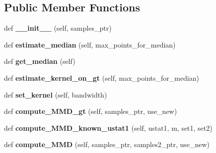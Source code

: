 \subsection*{Public Member Functions}
\begin{DoxyCompactItemize}
\item 
def {\bfseries \+\_\+\+\_\+init\+\_\+\+\_\+} (self, samples\+\_\+ptr)\hypertarget{classMMD_1_1MMD_aee6c212b82cacdcd4bceada64dd3ad97}{}\label{classMMD_1_1MMD_aee6c212b82cacdcd4bceada64dd3ad97}

\item 
def {\bfseries estimate\+\_\+median} (self, max\+\_\+points\+\_\+for\+\_\+median)\hypertarget{classMMD_1_1MMD_af224846bbc6951fd2c6621d98601299e}{}\label{classMMD_1_1MMD_af224846bbc6951fd2c6621d98601299e}

\item 
def {\bfseries get\+\_\+median} (self)\hypertarget{classMMD_1_1MMD_a013aa9cb2ebfadcdaf8d4661e9a451e8}{}\label{classMMD_1_1MMD_a013aa9cb2ebfadcdaf8d4661e9a451e8}

\item 
def {\bfseries estimate\+\_\+kernel\+\_\+on\+\_\+gt} (self, max\+\_\+points\+\_\+for\+\_\+median)\hypertarget{classMMD_1_1MMD_a6a584cc6723100eea920019b0d5f1902}{}\label{classMMD_1_1MMD_a6a584cc6723100eea920019b0d5f1902}

\item 
def {\bfseries set\+\_\+kernel} (self, bandwidth)\hypertarget{classMMD_1_1MMD_ad0f36278070313883a42b5cb7327fcd3}{}\label{classMMD_1_1MMD_ad0f36278070313883a42b5cb7327fcd3}

\item 
def {\bfseries compute\+\_\+\+M\+M\+D\+\_\+gt} (self, samples\+\_\+ptr, use\+\_\+new)\hypertarget{classMMD_1_1MMD_a7626a491ad1fd8dbec69e94c78759839}{}\label{classMMD_1_1MMD_a7626a491ad1fd8dbec69e94c78759839}

\item 
def {\bfseries compute\+\_\+\+M\+M\+D\+\_\+known\+\_\+ustat1} (self, ustat1, m, set1, set2)\hypertarget{classMMD_1_1MMD_acac49d722b26de3659f0a089fe448b0f}{}\label{classMMD_1_1MMD_acac49d722b26de3659f0a089fe448b0f}

\item 
def {\bfseries compute\+\_\+\+M\+MD} (self, samples\+\_\+ptr, samples2\+\_\+ptr, use\+\_\+new)\hypertarget{classMMD_1_1MMD_ae6f99f50715af594c34a31588e34d331}{}\label{classMMD_1_1MMD_ae6f99f50715af594c34a31588e34d331}

\end{DoxyCompactItemize}
